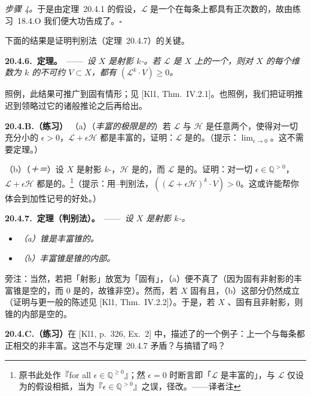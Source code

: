 \emph{步骤 4。}\quad 于是由\mbox{定理~20.4.1} 的假设，$\mathscr{L}$ 是一个在每条\trCurve{}上都具有正次数的\trBasePointFree{}\trLineBundle，故由\mbox{练习~18.4.O} 我们便大功告成了。\hfill$\square$

下面的结果是证明\trKleiman{}\trAmpleness{}判别法（\mbox{定理~20.4.7}）的关键。

\textbf{20.4.6.\ \trKleiman{}定理。}\ ——\ \emph{设 $X$ 是射影 $k$-\trScheme。若 $\mathscr{L}$ 是 $X$ 上的一个\trNef{}\trInvertibleSheaf，则对 $X$ 的每个维数为 $k$ 的不可约\trSubvariety{} $V\subset X$，都有 $(\mathscr{L}^k\cdot V)\ge 0$。}

照例，此结果可推广到固有情形；见 [Kl1, Thm.~IV.2.1]。也照例，我们把证明推迟到领略过它的诸般推论之后再给出。

\textbf{20.4.B.（练习）}\quad
（a）（\emph{丰富的极限是\trNef{}的}）若 $\mathscr{L}$ 与 $\mathscr{H}$ 是任意两个\trInvertibleSheaf，使得对一切充分小的 $\epsilon>0$，$\mathscr{L}+\epsilon\mathscr{H}$ 都是丰富的，证明：$\mathscr{L}$ 是\trNef{}的。（提示：$\lim_{\epsilon\to 0}$。这不需要\trKleiman{}定理。）

（b）（\emph{\trNef{}＋\trAmple{}＝\trAmple}）设 $X$ 是射影 $k$-\trScheme，$\mathscr{H}$ 是\trAmple{}的，而 $\mathscr{L}$ 是\trNef{}的。证明：对一切 $\epsilon\in\mathbb{Q}^{> 0}$，$\mathscr{L}+\epsilon\mathscr{H}$ 都是\trAmple{}的。\footnote{原书此处作『for all $\epsilon\in\mathbb{Q}^{\ge 0}$』；然 $\epsilon=0$ 时断言即「$\mathscr{L}$ 是丰富的」，与 $\mathscr{L}$ 仅设为\trNef{}的假设相抵，当为『$\epsilon\in\mathbb{Q}^{>0}$』之误，径改。——译者注}（提示：用\trNakai--\trMoishezon{}判别法，$((\mathscr{L}+\epsilon\mathscr{H})^k\cdot V)>0$。这或许能帮你体会到加性记号的好处。）

\textbf{20.4.7.\ 定理（\trKleiman{}\trAmpleness{}判别法）。}\ ——\ \emph{设 $X$ 是射影 $k$-\trScheme。}
\begin{itemize}[label={},leftmargin=2.2em,itemsep=2pt,topsep=3pt]
\item \emph{（a）\trNef{}锥是丰富锥的\trClosure。}
\item \emph{（b）丰富锥是\trNef{}锥的内部。}
\end{itemize}

旁注：当然，若把「射影」放宽为「固有」，（a）便不真了（因为固有非射影\trVariety{}的丰富锥是空的，而 $0$ 是\trNef{}的，故\trNef{}锥非空）。然而，若 $X$ 固有且\trFactorial，（b）这部分仍然成立（证明与更一般的陈述见 [Kl1, Thm.~IV.2.2]）。于是，若 $X$ \trSmooth、固有且非射影，则\trNef{}锥的内部是空的。

\textbf{20.4.C.（练习）}\quad 在 [Kl1, p.~326, Ex.~2] 中，\trKleiman{}描述了\trMumford{}的一个例子：\trSmooth\trProjective\trSurface{}上一个与每条\trCurve{}都正相交的非丰富\trLineBundle。这岂不与\mbox{定理~20.4.7} 矛盾？\trMumford{}与\trKleiman{}搞错了吗？

